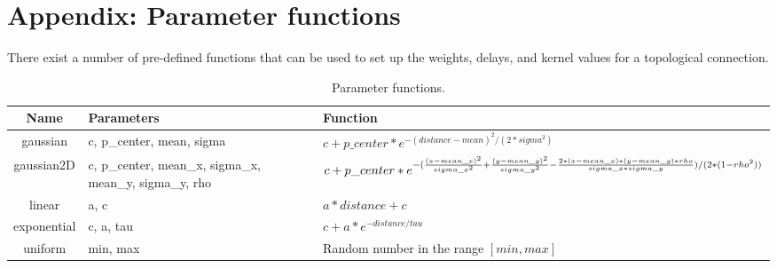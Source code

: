 \documentclass[landscape]{article}
\begin{document}
\part{Appendix: Parameter functions}

\large There exist a number of pre-defined functions that can be used to set up the weights, delays, and kernel values for a topological connection.

\begin{table}[h]
\Large
\begin{tabular}{ | c | p{3cm} | p{12cm} | }
\hline
\textbf{Name} & \textbf{Parameters} & \textbf{Function} \\ \hline
gaussian & c, p\_center, mean, sigma & \Large $c + p\_center * e^{-(distance-mean)^2/(2*sigma^2)}$ \\ \hline
gaussian2D & c, p\_center, mean\_x, sigma\_x, mean\_y, sigma\_y, rho & \Large $c + p\_center * \newline e^{-(\frac{(x-mean\_x)^2}{sigma\_x^2} + \frac{(y-mean\_y)^2}{sigma\_y^2} - \frac{2*(x-mean\_x)*(y-mean\_y)*rho}{sigma\_x*sigma\_y})/(2*(1-rho^2))}$ \\ \hline
linear & a, c & \Large $a*distance + c$ \\ \hline
exponential & c, a, tau & \Large $c + a * e^{-distance/tau}$ \\ \hline
uniform & min, max & \Large Random number in the range $[min, max]$ \\ \hline
\end{tabular}
\caption{Parameter functions.}
\end{table}


\clearpage




\end{document}
